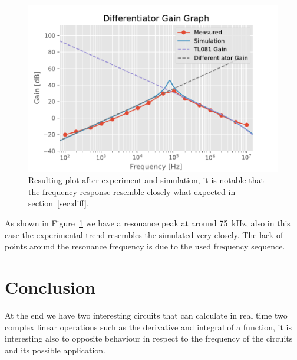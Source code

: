 \documentclass[a4paper, twocolumn]{article}
\begin{document}
\begin{figure}
    \centering
    \includegraphics{def_graph/Exp_Diff_graph.pdf}
    \caption{Resulting plot after experiment and simulation, it is notable that the frequency response resemble closely what expected in section~\ref{sec:diff}.}
    \label{fig:expDiff}
\end{figure}

As shown in Figure~\ref{fig:expDiff} we have a resonance peak at around \SI{75}{\kilo\hertz}, also in this case the experimental trend resembles the simulated very closely. The lack of points around the resonance frequency is due to the used frequency sequence.

\section{Conclusion}

At the end we have two interesting circuits that can calculate in real time two complex linear operations such as the derivative and integral of a function, it is interesting also to opposite behaviour in respect to the frequency of the circuits and its possible application.  
\end{document}
